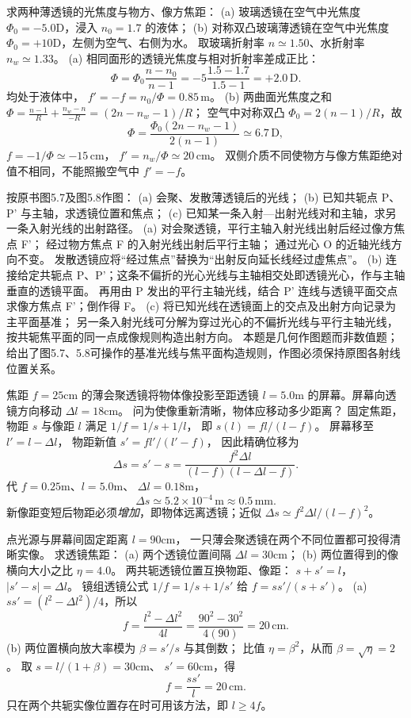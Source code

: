 求两种薄透镜的光焦度与物方、像方焦距：
(a) 玻璃透镜在空气中光焦度 $\Phi_0=-5.0$D，浸入
$n_0=1.7$ 的液体；
(b) 对称双凸玻璃薄透镜在空气中光焦度
$\Phi_0=+10$D，左侧为空气、右侧为水。
取玻璃折射率 $n\simeq1.50$、水折射率 $n_w\simeq1.33$。
\exsolution
(a) 相同面形的透镜光焦度与相对折射率差成正比：
\[
\Phi=\Phi_0\frac{n-n_0}{n-1}
=-5\frac{1.5-1.7}{1.5-1}=+2.0\,\mathrm D.
\]
均处于液体中，
$\boxed{f'=-f=n_0/\Phi=0.85\,\mathrm m}$。
(b) 两曲面光焦度之和
$\Phi=\frac{n-1}{R}+\frac{n_w-n}{-R}
=(2n-n_w-1)/R$；
空气中对称双凸 $\Phi_0=2(n-1)/R$，故
\[
\boxed{\Phi=\frac{\Phi_0(2n-n_w-1)}{2(n-1)}
\simeq6.7\,\mathrm D},
\]
$\boxed{f=-1/\Phi\simeq-15\,\mathrm{cm}}$，
$\boxed{f'=n_w/\Phi\simeq20\,\mathrm{cm}}$。
\excheck 双侧介质不同使物方与像方焦距绝对值不相同，不能照搬空气中 $f'=-f$。

按原书图5.7及图5.8作图：
(a) 会聚、发散薄透镜后的光线；
(b) 已知共轭点 P、P' 与主轴，求透镜位置和焦点；
(c) 已知某一条入射—出射光线对和主轴，求另一条入射光线的出射路径。
\exsolution
(a) 对会聚透镜，平行主轴入射光线出射后经过像方焦点 F'；
经过物方焦点 F 的入射光线出射后平行主轴；
通过光心 O 的近轴光线方向不变。
发散透镜应将“经过焦点”替换为“出射反向延长线经过虚焦点”。
(b) 连接给定共轭点 P、P'；这条不偏折的光心光线与主轴相交处即透镜光心，作与主轴垂直的透镜平面。
再用由 P 发出的平行主轴光线，结合 P' 连线与透镜平面交点求像方焦点 F'；倒作得 F。
(c) 将已知光线在透镜面上的交点及出射方向记录为主平面基准；
另一条入射光线可分解为穿过光心的不偏折光线与平行主轴光线，按共轭焦平面的同一点成像规则构造出射方向。
\excheck 本题是几何作图题而非数值题；给出了图5.7、5.8可操作的基准光线与焦平面构造规则，作图必须保持原图各射线位置关系。

焦距 $f=25$cm 的薄会聚透镜将物体像投影至距透镜 $l=5.0$m 的屏幕。屏幕向透镜方向移动
$\Delta l=18$cm。
问为使像重新清晰，物体应移动多少距离？
\exsolution
固定焦距，物距 $s$ 与像距 $l$ 满足
$1/f=1/s+1/l$，
即
$s(l)=fl/(l-f)$。
屏幕移至
$l'=l-\Delta l$，
物距新值
$s'=fl'/(l'-f)$，
因此精确位移为
\[
\Delta s=s'-s
=\frac{f^2\Delta l}{(l-f)(l-\Delta l-f)}.
\]
代 $f=0.25$m、$l=5.0$m、
$\Delta l=0.18$m，
\[
\boxed{\Delta s\simeq5.2\times10^{-4}\,\mathrm m
\approx0.5\,\mathrm{mm}}.
\]
\excheck 新像距变短后物距必须\emph{增加}，即物体远离透镜；近似 $\Delta s\simeq f^2\Delta l/(l-f)^2$。

点光源与屏幕间固定距离 $l=90$cm，
一只薄会聚透镜在两个不同位置都可投得清晰实像。
求透镜焦距：
(a) 两个透镜位置间隔 $\Delta l=30$cm；
(b) 两位置得到的像横向大小之比 $\eta=4.0$。
\exsolution
两共轭透镜位置互换物距、像距：
$s+s'=l$，$|s'-s|=\Delta l$。
镜组透镜公式 $1/f=1/s+1/s'$ 给
$f=ss'/(s+s')$。
(a) $ss'=(l^2-\Delta l^2)/4$，所以
\[
\boxed{f=\frac{l^2-\Delta l^2}{4l}
=\frac{90^2-30^2}{4(90)}=20\,\mathrm{cm}}.
\]
(b) 两位置横向放大率模为
$\beta=s'/s$ 与其倒数；
比值 $\eta=\beta^2$，从而
$\beta=\sqrt\eta=2$。
取 $s=l/(1+\beta)=30$cm、
$s'=60$cm，得
\[
\boxed{f=\frac{ss'}l=20\,\mathrm{cm}}.
\]
\excheck 只在两个共轭实像位置存在时可用该方法，即 $l\ge4f$。


